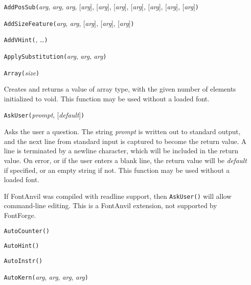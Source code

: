 \noindent\texttt{AddPosSub(}\textit{arg}, \textit{arg}, \textit{arg}, [\textit{arg}], [\textit{arg}], [\textit{arg}], [\textit{arg}], [\textit{arg}], [\textit{arg}], [\textit{arg}]\texttt{)}


\noindent\texttt{AddSizeFeature(}\textit{arg}, \textit{arg}, [\textit{arg}], [\textit{arg}], [\textit{arg}]\texttt{)}


\noindent\texttt{AddVHint(}, \ldots\texttt{)}


\noindent\texttt{ApplySubstitution(}\textit{arg}, \textit{arg}, \textit{arg}\texttt{)}


\noindent\texttt{Array(}\textit{size}\texttt{)}

Creates and returns a value of array type, with the given number of
elements initialized to void.
This function may be used without a loaded font.


\noindent\texttt{AskUser(}\textit{prompt}, [\textit{default}]\texttt{)}

Asks the user a question.  The string \textit{prompt} is written out to
standard output, and the next line from standard input is captured to become
the return value.  A line is terminated by a newline character, which will
be included in the return value.  On error, or if the user enters a blank
line, the return value will be \textit{default} if specified, or an empty
string if not.
This function may be used without a loaded font.

If \FFdiff FontAnvil was compiled with readline support, then
\texttt{AskUser()} will allow command-line editing.  This is a
FontAnvil extension, not supported by FontForge.


\noindent\texttt{AutoCounter(}\texttt{)}


\noindent\texttt{AutoHint(}\texttt{)}


\noindent\texttt{AutoInstr(}\texttt{)}


\noindent\texttt{AutoKern(}\textit{arg}, \textit{arg}, \textit{arg}, \textit{arg}\texttt{)}

